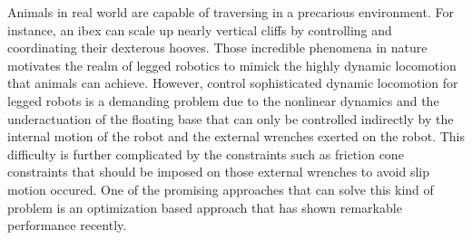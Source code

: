 \documentclass[conference]{IEEEtran}
\begin{document}
%
%
%
Animals in real world are capable of traversing in a precarious environment. For instance, an ibex can scale up nearly vertical cliffs by controlling and coordinating their dexterous hooves. Those incredible phenomena in nature motivates the realm of legged robotics to mimick the highly dynamic locomotion that animals can achieve. However, control sophisticated dynamic locomotion for legged robots is a demanding problem due to the nonlinear dynamics and the underactuation of the floating base that can only be controlled indirectly by the internal motion of the robot and the external wrenches exerted on the robot. This difficulty is further complicated by the constraints such as friction cone constraints that should be imposed on those external wrenches to avoid slip motion occured. One of the promising approaches that can solve this kind of problem is an optimization based approach that has shown remarkable performance recently.
\end{document}
